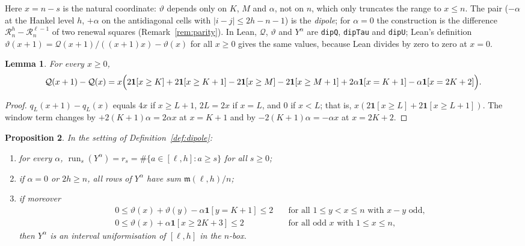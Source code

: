 \documentclass[11pt]{amsart}
\newtheorem{lemma}{Lemma}[section]
\newtheorem{proposition}[lemma]{Proposition}
\theoremstyle{definition}
\theoremstyle{remark}
\numberwithin{equation}{section}
\newcommand{\run}{\operatorname{run}}
\newcommand{\ind}[1]{\mathbf{1}[#1]}
\newcommand{\cQ}{\mathcal{Q}}
\newcommand{\cR}{\mathcal{R}}
\newcommand{\ms}{\mathfrak{m}}
\newcommand{\lean}[1]{\texttt{#1}}
\begin{document}
Here $x=n-s$ is the natural coordinate: $\vartheta$ depends only on $K$, $M$ and $\alpha$, not on $n$,
which only truncates the range to $x\le n$. The pair ($-\alpha$ at the Hankel level $h$, $+\alpha$ on the
antidiagonal cells with $|i-j|\le2h-n-1$) is the \emph{dipole}; for $\alpha=0$ the construction is the
difference $\cR^h_n-\cR^{\ell-1}_n$ of two renewal squares (Remark~\ref{rem:parity}). In Lean,
$\cQ$, $\vartheta$ and $Y^\alpha$ are \lean{dipQ}, \lean{dipTau} and \lean{dipU}; Lean's definition
$\vartheta(x+1)=\cQ(x+1)/((x+1)x)-\vartheta(x)$ for all $x\ge0$ gives the same values, because Lean
divides by zero to zero at $x=0$.

\begin{lemma}\label{lem:Qdiff}
For every $x\ge0$,
\[
  \cQ(x+1)-\cQ(x)=x\Bigl(2\ind{x\ge K}+2\ind{x\ge K+1}-2\ind{x\ge M}-2\ind{x\ge M+1}
  +2\alpha\ind{x=K+1}-\alpha\ind{x=2K+2}\Bigr).
\]
\end{lemma}

\begin{proof}
$q_L(x+1)-q_L(x)$ equals $4x$ if $x\ge L+1$, $2L=2x$ if $x=L$, and $0$ if $x<L$; that is,
$x(2\ind{x\ge L}+2\ind{x\ge L+1})$. The window term changes by $+2(K+1)\alpha=2\alpha x$ at $x=K+1$ and
by $-2(K+1)\alpha=-\alpha x$ at $x=2K+2$.
\end{proof}

\begin{proposition}\label{prop:dipole}
In the setting of Definition~\ref{def:dipole}:
\begin{enumerate}
\item[(a)] for every $\alpha$, $\run_s(Y^\alpha)=r_s=\#\{a\in[\ell,h]:a\ge s\}$ for all $s\ge0$;
\item[(b)] if $\alpha=0$ or $2h\ge n$, all rows of $Y^\alpha$ have sum $\ms(\ell,h)/n$;
\item[(c)] if moreover
\begin{align}
  0\le\vartheta(x)+\vartheta(y)-\alpha\ind{y=K+1}\le2&\quad\text{for all }1\le y<x\le n\text{ with }x-y\text{ odd},
  \tag{CELL1}\label{eq:cell1}\\
  0\le\vartheta(x)+\alpha\ind{x\ge2K+3}\le2&\quad\text{for all odd }x\text{ with }1\le x\le n,
  \tag{CELL2}\label{eq:cell2}
\end{align}
then $Y^\alpha$ is an interval uniformisation of $[\ell,h]$ in the $n$-box.
\end{enumerate}
\end{proposition}
\end{document}
